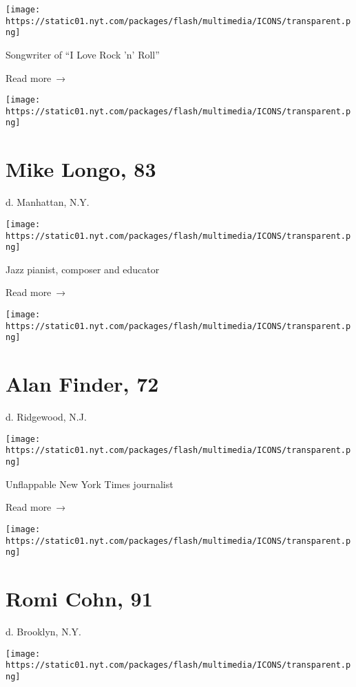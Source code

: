\texttt{[image: https://static01.nyt.com/packages/flash/multimedia/ICONS/transparent.png]}

Songwriter of ``I Love Rock 'n' Roll''

 Read more~→

\href{https://www.nytimes.com/2020/03/28/arts/music/mike-longo-dead-coronavirus.html}{}

\texttt{[image: https://static01.nyt.com/packages/flash/multimedia/ICONS/transparent.png]}

\hypertarget{mike-longo-83}{%
\section{Mike Longo, 83}\label{mike-longo-83}}

d. Manhattan, N.Y.

\texttt{[image: https://static01.nyt.com/packages/flash/multimedia/ICONS/transparent.png]}

Jazz pianist, composer and educator

 Read more~→

\href{https://www.nytimes.com/2020/03/27/obituaries/alan-finder-dead-coronavirus.html}{}

\texttt{[image: https://static01.nyt.com/packages/flash/multimedia/ICONS/transparent.png]}

\hypertarget{alan-finder-72}{%
\section{Alan Finder, 72}\label{alan-finder-72}}

d. Ridgewood, N.J.

\texttt{[image: https://static01.nyt.com/packages/flash/multimedia/ICONS/transparent.png]}

Unflappable New York Times journalist

 Read more~→

\href{https://www.nytimes.com/2020/03/27/obituaries/romi-cohn-dead-coronavirus.html}{}

\texttt{[image: https://static01.nyt.com/packages/flash/multimedia/ICONS/transparent.png]}

\hypertarget{romi-cohn-91}{%
\section{Romi Cohn, 91}\label{romi-cohn-91}}

d. Brooklyn, N.Y.

\texttt{[image: https://static01.nyt.com/packages/flash/multimedia/ICONS/transparent.png]}

